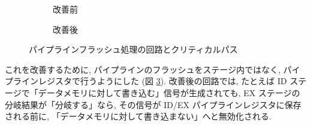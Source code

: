 \documentclass[../improvements.tex]{subfiles}
\begin{document}
  \begin{figure}
    \centering
    \begin{subfigure}{\columnwidth}
      \centering
      \caption{改善前}
      \label{fig:critical-path-before}
    \end{subfigure}
    \begin{subfigure}{\columnwidth}
      \centering
      \caption{改善後}
      \label{fig:critical-path-after}
    \end{subfigure}
    \caption{パイプラインフラッシュ処理の回路とクリティカルパス}
  \end{figure}

  これを改善するために, パイプラインのフラッシュをステージ内ではなく, 
  パイプラインレジスタで行うようにした (図 \ref{fig:critical-path-after}).
  改善後の回路では, たとえば ID ステージで「データメモリに対して書き込む」信号が生成されても, 
  EX ステージの分岐結果が「分岐する」なら, 
  その信号が ID/EX パイプラインレジスタに保存される前に, 「データメモリに対して書き込まない」へと無効化される.
\end{document}
